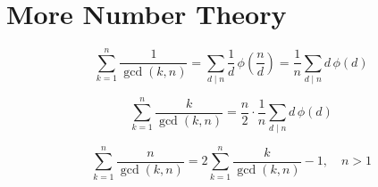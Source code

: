 





\section{More Number Theory}

\[
\sum_{k=1}^n \frac{1}{\gcd(k,n)}
= \sum_{d\mid n} \frac{1}{d}\,\phi\!\left(\frac{n}{d}\right)
= \frac{1}{n} \sum_{d\mid n} d\,\phi(d)
\]

\[
\sum_{k=1}^n \frac{k}{\gcd(k,n)}
= \frac{n}{2} \cdot \frac{1}{n}
  \sum_{d\mid n} d\,\phi(d)
\]

\[
\sum_{k=1}^{n} \frac{n}{\gcd(k,n)}
= 2 \sum_{k=1}^{n} \frac{k}{\gcd(k,n)} - 1,
\quad n > 1
\]

